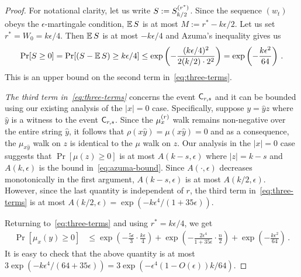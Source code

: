 \begin{proof}
For notational clarity, let us write $S := S^{(r^*)}_{k/2}$. 
Since the sequence $(w_t)$ obeys the $\epsilon$-martingale condition, 
$\operatorname{\mathbb{E}} S$ is at most $M := r^* - k\epsilon/2$. 
Let us set $r^* = W_0 = k\epsilon/4$. Then $\operatorname{\mathbb{E}} S$ is at most $-k\epsilon/4$ and Azuma's inequality gives us
\[
\Pr[S \geq 0] 
= \Pr[(S - \operatorname{\mathbb{E}} S) \geq k\epsilon/4] 
\leq \exp\left( - \frac{(k\epsilon/4)^2}{2(k/2)\cdot 2^2}\right) 
= \exp\left( -\frac{k \epsilon^2}{64} \right)
\, .
\]
This is an upper bound on the second term in~\eqref{eq:three-terms}.

\emph{The third term in~\eqref{eq:three-terms}} concerns the event $\mathsf{C}_{r,s}$ and it can be bounded using 
our existing analysis of the $|x|=0$ case. 
Specifically, suppose $y = \hat{y} z$ where
$\hat{y}$ is a witness to the event $\mathsf{C}_{r,s}$. 
Since the $\mu_x^{(r)}$ walk remains non-negative over the entire string $\hat{y}$, 
it follows that $\rho(x\hat{y}) = \mu(x\hat{y}) = 0$ 
and as a consequence, the $\mu_{x\hat{y}}$ walk on $z$ is identical to 
the $\mu$ walk on $z$. 
Our analysis in the $|x| = 0$ case suggests that 
$\Pr[\mu(z) \geq 0]$ is at most $A(k-s, \epsilon)$ 
where $|z| = k - s$ and $A(k, \epsilon)$ is the bound in~\eqref{eq:azuma-bound}. 
Since $A(\cdot,\epsilon)$ decreases monotonically in the first argument, 
$A(k-s, \epsilon)$ is at most $A(k/2, \epsilon)$. 
However, since the last quantity is independent of $r$, 
the third term in~\eqref{eq:three-terms} is at most 
$A(k/2, \epsilon) = \exp\left( -k \epsilon^4/(1+35\epsilon) \right)$. 


Returning to~\eqref{eq:three-terms} and using $r^* = k\epsilon/4$, we get
\begin{align*}
\Pr[\mu_x(y) \geq 0] 
 &\leq    \exp\left(-\frac{5 \epsilon}{3} \cdot \frac{k\epsilon}{4} \right)  
        + \exp\left(-\frac{2\epsilon^4}{1 + 35\epsilon} \cdot \frac{n}{2}\right)
        + \exp\left( -\frac{k \epsilon^2}{64} \right)
\, .
\end{align*}
It is easy to check that the above quantity is at most
$
  3 \exp\left( - k \epsilon^4/(64 + 35 \epsilon) \right) 
= 3 \exp\left( - \epsilon^4 (1 - O(\epsilon) ) k/64 \right)
$.

\end{proof}
